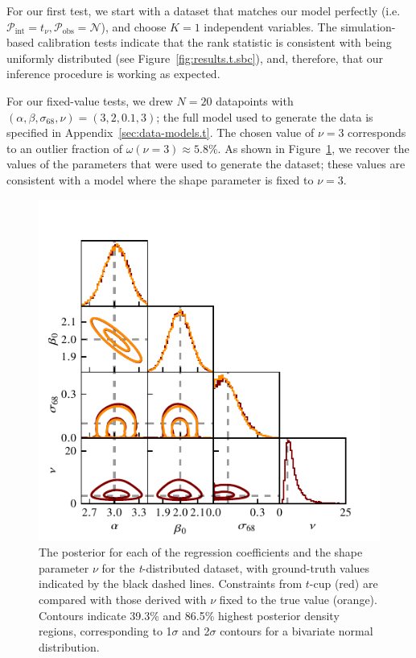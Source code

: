 \documentclass[fleqn,usenatbib]{rasti}
\begin{document}
For our first test, we start with a dataset that matches our model perfectly
(i.e.\ $\mathcal P_{\text{int}} = t_\nu, \mathcal P_{\text{obs}} =
\mathcal{N}$), and choose $K=1$ independent variables. The simulation-based
calibration tests indicate that the rank statistic is consistent with being
uniformly distributed (see Figure~\ref{fig:results.t.sbc}), and, therefore, that
our inference procedure is working as expected.

For our fixed-value tests, we drew $N = 20$ datapoints with $(\alpha, \beta,
\sigma_{68}, \nu) = (3, 2, 0.1, 3)$; the full model used to generate the data is
specified in Appendix~\ref{sec:data-models.t}. The chosen value of $\nu = 3$
corresponds to an outlier fraction of $\omega(\nu = 3) \approx 5.8 \%$.  As
shown in Figure~\ref{fig:results.t.corner}, we recover the values of the
parameters that were used to generate the dataset; these values are consistent
with a model where the shape parameter is fixed to $\nu = 3$.

\begin{figure}
    \includegraphics[width=\columnwidth]{graphics/fixed/corner_t.pdf}
    \caption{The posterior for each of the regression coefficients and the shape
    parameter $\nu$ for the \textit{t}-distributed dataset, with ground-truth
    values indicated by the black dashed lines. Constraints from $t$-cup (red)
    are compared with those derived with $\nu$ fixed to the true value (orange).
    Contours indicate 39.3\% and 86.5\% highest posterior density regions,
    corresponding to 1$\sigma$ and 2$\sigma$ contours for a bivariate normal
    distribution.}
    \label{fig:results.t.corner}
\end{figure}
\end{document}
